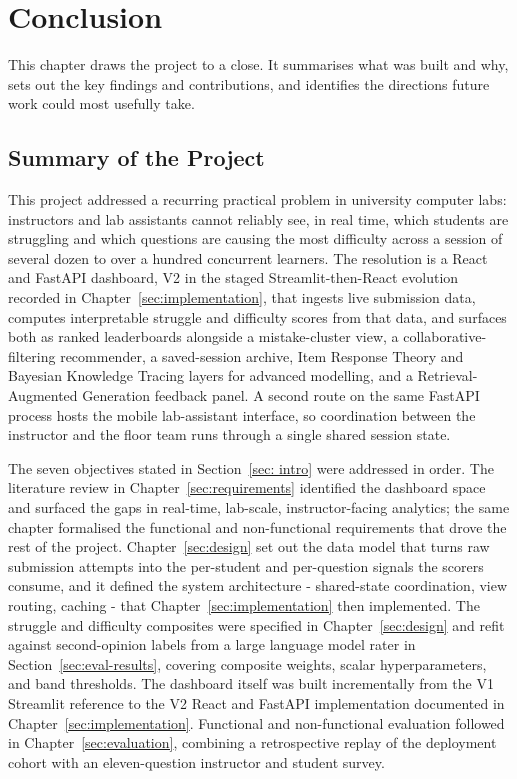 \section{Conclusion} \label{sec:conclusion}

This chapter draws the project to a close. It summarises what was built and why, sets out the key findings and contributions, and identifies the directions future work could most usefully take.

\subsection{Summary of the Project}

This project addressed a recurring practical problem in university computer labs: instructors and lab assistants cannot reliably see, in real time, which students are struggling and which questions are causing the most difficulty across a session of several dozen to over a hundred concurrent learners.
The resolution is a React and FastAPI dashboard, V2 in the staged Streamlit-then-React evolution recorded in Chapter~\ref{sec:implementation}, that ingests live submission data, computes interpretable struggle and difficulty scores from that data, and surfaces both as ranked leaderboards alongside a mistake-cluster view, a collaborative-filtering recommender, a saved-session archive, Item Response Theory and Bayesian Knowledge Tracing layers for advanced modelling, and a Retrieval-Augmented Generation feedback panel.
A second route on the same FastAPI process hosts the mobile lab-assistant interface, so coordination between the instructor and the floor team runs through a single shared session state.

The seven objectives stated in Section~\ref{sec: intro} were addressed in order.
The literature review in Chapter~\ref{sec:requirements} identified the dashboard space and surfaced the gaps in real-time, lab-scale, instructor-facing analytics; the same chapter formalised the functional and non-functional requirements that drove the rest of the project.
Chapter~\ref{sec:design} set out the data model that turns raw submission attempts into the per-student and per-question signals the scorers consume, and it defined the system architecture - shared-state coordination, view routing, caching - that Chapter~\ref{sec:implementation} then implemented.
The struggle and difficulty composites were specified in Chapter~\ref{sec:design} and refit against second-opinion labels from a large language model rater in Section~\ref{sec:eval-results}, covering composite weights, scalar hyperparameters, and band thresholds.
The dashboard itself was built incrementally from the V1 Streamlit reference to the V2 React and FastAPI implementation documented in Chapter~\ref{sec:implementation}.
Functional and non-functional evaluation followed in Chapter~\ref{sec:evaluation}, combining a retrospective replay of the deployment cohort with an eleven-question instructor and student survey.

